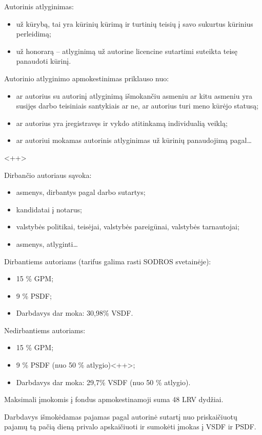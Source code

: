 Autorinis atlyginimas:
\begin{itemize}
  \item už kūrybą, tai yra kūrinių kūrimą ir turtinių teisių į savo
    sukurtus kūrinius perleidimą;
  \item už honorarą – atlyginimą už autorine licencine sutartimi
    suteikta teisę panaudoti kūrinį.
\end{itemize}

Autorinio atlyginimo apmokestinimas priklauso nuo:
\begin{itemize}
  \item ar autorius su autorinį atlyginimą išmokančiu asmeniu ar kitu
    asmeniu yra susijęs darbo teisiniais santykiais ar ne, ar 
    autorius turi meno kūrėjo statusą;
  \item ar autorius yra įregistravęs ir vykdo atitinkamą individualią
    veiklą;
  \item ar autoriui mokamas autorinis atlyginimas už kūrinių panaudojimą
    pagal…
\end{itemize}<++>

Dirbančio autoriaus sąvoka:
\begin{itemize}
  \item asmenys, dirbantys pagal darbo sutartys;
  \item kandidatai į notarus;
  \item valstybės politikai, teisėjai, valstybės pareigūnai, valstybės
    tarnautojai;
  \item asmenys, atlyginti…
\end{itemize}

Dirbantiems autoriams (tarifus galima rasti SODROS svetainėje):
\begin{itemize}
  \item 15 \% GPM;
  \item 9 \% PSDF;
  \item Darbdavys dar moka: 30,98\% VSDF.
\end{itemize}

Nedirbantiems autoriams:
\begin{itemize}
  \item 15 \% GPM;
  \item 9 \% PSDF (nuo 50 \% atlygio)<++>;
  \item Darbdavys dar moka: 29,7\% VSDF (nuo 50 \% atlygio).
\end{itemize}

Maksimali įmokomis į fondus apmokestinamoji suma 48 LRV dydžiai.

Darbdavys išmokėdamas pajamas pagal autorinė sutartį nuo priskaičiuotų
pajamų tą pačią dieną privalo apskaičiuoti ir sumokėti įmokas į
VSDF ir PSDF.

